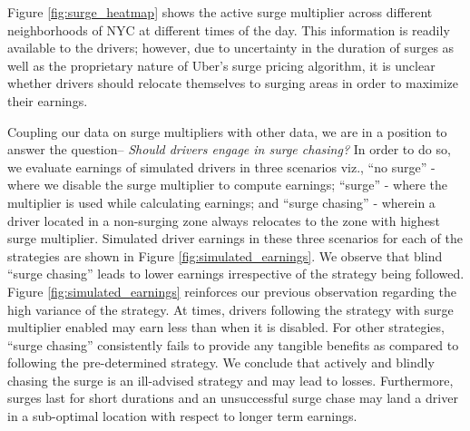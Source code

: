 Figure \ref{fig:surge_heatmap} shows the active surge multiplier across different neighborhoods of NYC at 
different times of the day. 
This information is readily available to the drivers; however, due to uncertainty in the duration of surges 
  as well as the proprietary nature of Uber's surge pricing algorithm, 
  it is unclear whether drivers should relocate themselves to surging areas in order to maximize their earnings. 

Coupling our data on surge multipliers with other data, we are in a position to answer the question-- \textit{Should drivers engage in surge chasing?}
In order to do so, we evaluate earnings of simulated drivers in three scenarios viz., 
``no surge'' - where we disable the surge multiplier to compute earnings; ``surge'' - 
where the multiplier is used while calculating earnings; and ``surge chasing'' -
wherein a driver located in a non-surging zone always relocates to the zone with highest surge multiplier. 
Simulated driver earnings in these three scenarios for each of the strategies are shown in Figure {\ref{fig:simulated_earnings}}. 
We observe that blind ``surge chasing'' leads to lower earnings irrespective of the strategy being followed. 
Figure \ref{fig:simulated_earnings} reinforces our previous observation regarding the high variance of the {\naive} strategy. 
At times, drivers following the {\naive} strategy with surge multiplier enabled may earn less than when it is disabled. 
For other strategies, ``surge chasing'' consistently fails to provide any tangible benefits as compared to 
following the pre-determined strategy. We conclude that actively and blindly chasing the surge is an ill-advised 
strategy and may lead to losses. Furthermore, surges last for short durations and an unsuccessful surge chase 
may land a driver in a sub-optimal location with respect to longer term earnings. 

